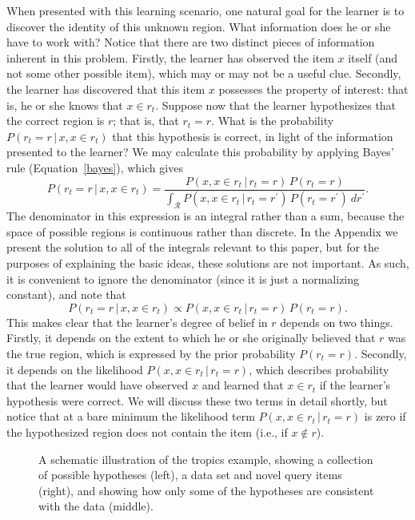 \documentclass[doc]{apa6}
\newcommand{\rt}{{r_t}}
\newcommand{\condon}{\, | \,}
\newcommand{\pgap}{\,}
\begin{document}
When presented with this learning scenario, one natural goal for the learner is to discover the identity of this unknown region. What information does he or she have to work with? Notice that there are two distinct pieces of information inherent in this problem. Firstly, the learner has observed the item $x$ itself (and not some other possible item), which may or may not be a useful clue. Secondly, the learner has discovered that this item $x$ possesses the property of interest: that is, he or she knows that $x \in \rt$. Suppose now that the learner hypothesizes that the correct region is $r$; that is, that $\rt =r$. What is the probability $P(\rt=r \condon  x, x \in \rt)$ that this hypothesis is correct, in light of the information presented to the learner? We may calculate this probability by applying Bayes' rule (Equation~\ref{bayes}), which gives
\begin{equation}
P(\rt=r \condon  x, x\in \rt) = \frac{P(x, x \in \rt \condon \rt = r) \pgap P(\rt = r)}{\int_\mathcal{R} P(x, x \in \rt \condon  \rt = r^\prime) \pgap P(\rt = r^\prime) \ dr^\prime}.
\end{equation}
The denominator in this expression is an integral rather than a sum, because the space of possible regions is continuous rather than discrete. In the Appendix we present the solution to all of the integrals relevant to this paper, but for the purposes of explaining the basic ideas, these solutions are not important. As such, it is convenient to ignore the denominator (since it is just a normalizing constant), and note that
\begin{equation}
P(\rt=r \condon  x, x\in \rt) \propto P(x, x \in \rt \condon  \rt = r) \pgap P(\rt = r).
\end{equation}
This makes clear that the learner's degree of belief in $r$ depends on two things. Firstly, it depends on the extent to which he or she originally believed that $r$ was the true region, which is expressed by the prior probability $P(\rt = r)$. Secondly, it depends on the likelihood $P(x, x \in \rt \condon  \rt = r)$, which describes probability that the learner would have observed $x$ and learned that $x \in \rt$ if the learner's hypothesis were correct. We will discuss these two terms in detail shortly, but notice that at a bare minimum the likelihood term $P(x, x \in \rt \condon  \rt = r)$ is zero if the hypothesized region does not contain the item (i.e., if $x \notin r$).

\begin{figure}
\begin{center}
\caption{A schematic illustration of the tropics example, showing a collection of possible hypotheses (left), a data set and novel query items (right), and showing how only some of the hypotheses are consistent with the data (middle).}
\label{tropics}
\end{center}
\end{figure}
\end{document}
